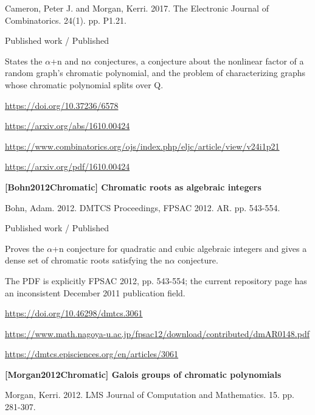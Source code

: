\documentclass[11pt,a4paper,oneside,openany]{book}
\begin{document}
\color{black} Cameron, Peter J. and Morgan, Kerri. 2017. The Electronic Journal of Combinatorics. 24(1). pp. P1.21.\par
{\small\sffamily\color{atlasgold}Published work / Published}\par
\color{black} States the \ensuremath{\alpha}+n and n\ensuremath{\alpha} conjectures, a conjecture about the nonlinear factor of a random graph's chromatic polynomial, and the problem of characterizing graphs whose chromatic polynomial splits over Q.\par
{\footnotesize\url{https://doi.org/10.37236/6578}}\par
{\footnotesize\url{https://arxiv.org/abs/1610.00424}}\par
{\footnotesize\url{https://www.combinatorics.org/ojs/index.php/eljc/article/view/v24i1p21}}\par
{\footnotesize\url{https://arxiv.org/pdf/1610.00424}}\par
\vspace{9pt}
\hypertarget{ref:Bohn2012Chromatic}{}
{\sffamily\bfseries\color{atlasgreen}[Bohn2012Chromatic] Chromatic roots as algebraic integers}\par
\color{black} Bohn, Adam. 2012. DMTCS Proceedings, FPSAC 2012. AR. pp. 543-554.\par
{\small\sffamily\color{atlasgold}Published work / Published}\par
\color{black} Proves the \ensuremath{\alpha}+n conjecture for quadratic and cubic algebraic integers and gives a dense set of chromatic roots satisfying the n\ensuremath{\alpha} conjecture.\par
{\small The PDF is explicitly FPSAC 2012, pp. 543-554; the current repository page has an inconsistent December 2011 publication field.}\par
{\footnotesize\url{https://doi.org/10.46298/dmtcs.3061}}\par
{\footnotesize\url{https://www.math.nagoya-u.ac.jp/fpsac12/download/contributed/dmAR0148.pdf}}\par
{\footnotesize\url{https://dmtcs.episciences.org/en/articles/3061}}\par
\vspace{9pt}
\hypertarget{ref:Morgan2012Chromatic}{}
{\sffamily\bfseries\color{atlasgreen}[Morgan2012Chromatic] Galois groups of chromatic polynomials}\par
\color{black} Morgan, Kerri. 2012. LMS Journal of Computation and Mathematics. 15. pp. 281-307.\par
\end{document}
